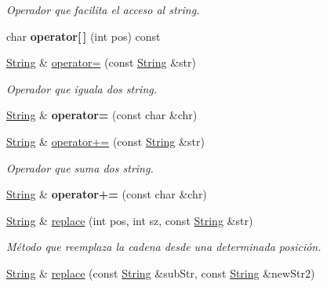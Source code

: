 \begin{DoxyCompactItemize}
\begin{DoxyCompactList}\small\item\em Operador que facilita el acceso al string. \end{DoxyCompactList}\item 
\mbox{\label{class_string_af6aec02d2aed12bd9e56724e070d21d0}} 
char {\bfseries operator\mbox{[}$\,$\mbox{]}} (int pos) const
\item 
\mbox{\label{class_string_aa3435c4a0cb1bf07534098c16693971d}} 
\hyperlink{class_string}{String} \& \hyperlink{class_string_aa3435c4a0cb1bf07534098c16693971d}{operator=} (const \hyperlink{class_string}{String} \&str)
\begin{DoxyCompactList}\small\item\em Operador que iguala dos string. \end{DoxyCompactList}\item 
\mbox{\label{class_string_a6857d06cd9b741bc7cd9087f1bc5eebc}} 
\hyperlink{class_string}{String} \& {\bfseries operator=} (const char \&chr)
\item 
\mbox{\label{class_string_a758334cc067e2595976ad0ec2f3747f9}} 
\hyperlink{class_string}{String} \& \hyperlink{class_string_a758334cc067e2595976ad0ec2f3747f9}{operator+=} (const \hyperlink{class_string}{String} \&str)
\begin{DoxyCompactList}\small\item\em Operador que suma dos string. \end{DoxyCompactList}\item 
\mbox{\label{class_string_a5995c42c9afd6f4d08937301376541a4}} 
\hyperlink{class_string}{String} \& {\bfseries operator+=} (const char \&chr)
\item 
\hyperlink{class_string}{String} \& \hyperlink{class_string_a767d727438ffc76ba42a89498adca4d0}{replace} (int pos, int sz, const \hyperlink{class_string}{String} \&str)
\begin{DoxyCompactList}\small\item\em Método que reemplaza la cadena desde una determinada posición. \end{DoxyCompactList}\item 
\hyperlink{class_string}{String} \& \hyperlink{class_string_a6386bfc836657af198419db8165d7caa}{replace} (const \hyperlink{class_string}{String} \&sub\+Str, const \hyperlink{class_string}{String} \&new\+Str2)

\end{DoxyCompactItemize}
